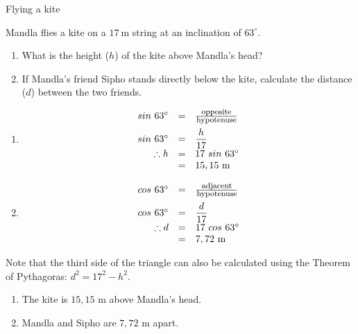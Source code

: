 \begin{wex}{Flying a kite}
{Mandla flies a kite on a $17~$m string at an inclination of $63^{\circ}$.
\begin{enumerate}[noitemsep, label=\textbf{\arabic*}. ] 
 \item What is the height ($h$) of the kite above Mandla's head?
\item If Mandla's friend Sipho stands directly below the kite, calculate the distance ($d$) between the two friends. 
\end{enumerate}
}
{

\begin{enumerate}[noitemsep, label=\textbf{\arabic*}. ] 
\item
\begin{equation*}
 \begin{array}{ccl}
\hfill sin~63^{\circ} &= & \frac{\mbox{\footnotesize opposite}}{\mbox{\footnotesize hypotenuse}} \hfill \vspace{5pt}\\
\hfill sin~63^{\circ} &=& \dfrac{h}{17} \hfill \\
\hfill \therefore h &= & 17~sin ~63^{\circ} \hfill \\
\hfill &=& 15,15~\mbox{m} \hfill \\
   \end{array}
\end{equation*}

\item
\begin{equation*}
 \begin{array}{ccl}
\hfill cos~63^{\circ} &= & \frac{\mbox{\footnotesize adjacent}}{\mbox{\footnotesize hypotenuse}} \hfill \vspace{5pt}\\
\hfill cos~63^{\circ} &=& \dfrac{d}{17} \hfill \\
\hfill \therefore d &= & 17~cos ~63^{\circ} \hfill \\
\hfill  &=& 7,72~\mbox{m} \hfill \\
\end{array}
\end{equation*}
\end{enumerate}
Note that the third side of the triangle can also be calculated using the Theorem of Pythagoras: $d^{2} = 17^{2} - h^{2}$.

\begin{enumerate}[noitemsep, label=\textbf{\arabic*}. ] 
\item The kite is $15,15$ m above Mandla's head.
\item Mandla and Sipho are $7,72$ m apart.
\end{enumerate}
}
 
\end{wex}

